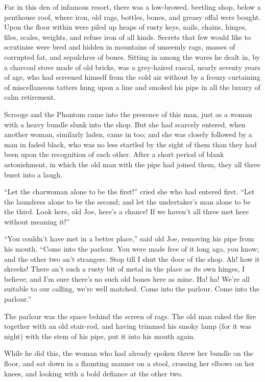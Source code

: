 \documentclass[paper=5.5in:8.5in,BCOR=7mm,twoside,DIV=calc,12pt,usegeometry]{scrbook} %
\begin{document}
Far in this den of infamous resort, there was a low-browed, beetling shop, below a penthouse roof, where iron, old rags, bottles, bones, and greasy offal were bought. Upon the floor within were piled up heaps of rusty keys, nails, chains, hinges, files, scales, weights, and refuse iron of all kinds. Secrets that few would like to scrutinise were bred and hidden in mountains of unseemly rags, masses of corrupted fat, and sepulchres of bones. Sitting in among the wares he dealt in, by a charcoal stove made of old bricks, was a grey-haired rascal, nearly seventy years of age, who had screened himself from the cold air without by a frouzy curtaining of miscellaneous tatters hung upon a line and smoked his pipe in all the luxury of calm retirement.

Scrooge and the Phantom came into the presence of this man, just as a woman with a heavy bundle slunk into the shop. But she had scarcely entered, when another woman, similarly laden, came in too; and she was closely followed by a man in faded black, who was no less startled by the sight of them than they had been upon the recognition of each other. After a short period of blank astonishment, in which the old man with the pipe had joined them, they all three burst into a laugh.

\enquote{Let the charwoman alone to be the first!} cried she who had en\-tered first. \enquote{Let the laundress alone to be the second; and let the undertaker's man alone to be the third. Look here, old Joe, here's a chance! If we haven't all three met here without meaning it!}

\enquote{You couldn't have met in a better place,} said old Joe, removing his pipe from his mouth. \enquote{Come into the parlour. You were made free of it long ago, you know; and the other two an't strangers. Stop till I shut the door of the shop. Ah! how it skreeks! There an't such a rusty bit of metal in the place as its own hinges, I believe; and I'm sure there's no such old bones here as mine. Ha! ha! We're all suitable to our calling, we're well matched. Come into the parlour. Come into the parlour.}

The parlour was the space behind the screen of rags. The old man raked the fire together with an old stair-rod, and having trimmed his smoky lamp (for it was night) with the stem of his pipe, put it into his mouth again.

While he did this, the woman who had already spoken threw her bundle on the floor, and sat down in a flaunting manner on a stool, crossing her elbows on her knees, and looking with a bold defiance at the other two.
\end{document}
